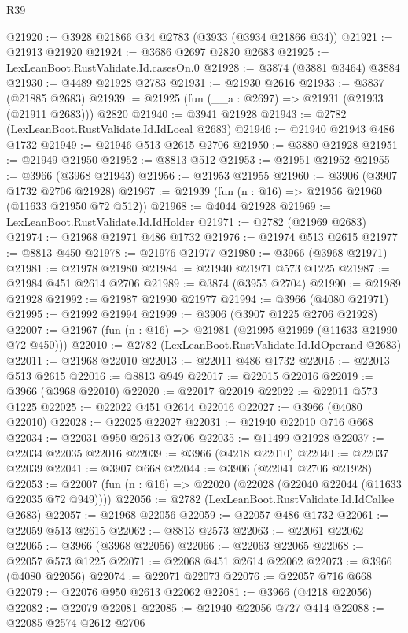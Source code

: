 \begin{lexlean}{R39}
\begin{coremodule}
@21920 := @3928 @21866 @34 @2783 (@3933 (@3934 @21866 @34))
@21921 := @21913 @21920
@21924 := @3686 @2697 @2820 @2683
@21925 := LexLeanBoot.RustValidate.Id.casesOn.{0}
@21928 := @3874 (@3881 @3464) @3884
@21930 := @4489 @21928 @2783
@21931 := @21930 @2616
@21933 := @3837 (@21885 @2683)
@21939 := @21925 (fun (__a : @2697) => @21931 (@21933 (@21911 @2683))) @2820
@21940 := @3941 @21928
@21943 := @2782 (LexLeanBoot.RustValidate.Id.IdLocal @2683)
@21946 := @21940 @21943 @486 @1732
@21949 := @21946 @513 @2615 @2706
@21950 := @3880 @21928
@21951 := @21949 @21950
@21952 := @8813 @512
@21953 := @21951 @21952
@21955 := @3966 (@3968 @21943)
@21956 := @21953 @21955
@21960 := @3906 (@3907 @1732 @2706 @21928)
@21967 := @21939 (fun (n : @16) => @21956 @21960 (@11633 @21950 @72 @512))
@21968 := @4044 @21928
@21969 := LexLeanBoot.RustValidate.Id.IdHolder
@21971 := @2782 (@21969 @2683)
@21974 := @21968 @21971 @486 @1732
@21976 := @21974 @513 @2615
@21977 := @8813 @450
@21978 := @21976 @21977
@21980 := @3966 (@3968 @21971)
@21981 := @21978 @21980
@21984 := @21940 @21971 @573 @1225
@21987 := @21984 @451 @2614 @2706
@21989 := @3874 (@3955 @2704)
@21990 := @21989 @21928
@21992 := @21987 @21990 @21977
@21994 := @3966 (@4080 @21971)
@21995 := @21992 @21994
@21999 := @3906 (@3907 @1225 @2706 @21928)
@22007 := @21967 (fun (n : @16) => @21981 (@21995 @21999 (@11633 @21990 @72 @450)))
@22010 := @2782 (LexLeanBoot.RustValidate.Id.IdOperand @2683)
@22011 := @21968 @22010
@22013 := @22011 @486 @1732
@22015 := @22013 @513 @2615
@22016 := @8813 @949
@22017 := @22015 @22016
@22019 := @3966 (@3968 @22010)
@22020 := @22017 @22019
@22022 := @22011 @573 @1225
@22025 := @22022 @451 @2614 @22016
@22027 := @3966 (@4080 @22010)
@22028 := @22025 @22027
@22031 := @21940 @22010 @716 @668
@22034 := @22031 @950 @2613 @2706
@22035 := @11499 @21928
@22037 := @22034 @22035 @22016
@22039 := @3966 (@4218 @22010)
@22040 := @22037 @22039
@22041 := @3907 @668
@22044 := @3906 (@22041 @2706 @21928)
@22053 := @22007 (fun (n : @16) => @22020 (@22028 (@22040 @22044 (@11633 @22035 @72 @949))))
@22056 := @2782 (LexLeanBoot.RustValidate.Id.IdCallee @2683)
@22057 := @21968 @22056
@22059 := @22057 @486 @1732
@22061 := @22059 @513 @2615
@22062 := @8813 @2573
@22063 := @22061 @22062
@22065 := @3966 (@3968 @22056)
@22066 := @22063 @22065
@22068 := @22057 @573 @1225
@22071 := @22068 @451 @2614 @22062
@22073 := @3966 (@4080 @22056)
@22074 := @22071 @22073
@22076 := @22057 @716 @668
@22079 := @22076 @950 @2613 @22062
@22081 := @3966 (@4218 @22056)
@22082 := @22079 @22081
@22085 := @21940 @22056 @727 @414
@22088 := @22085 @2574 @2612 @2706

\end{coremodule}
\end{lexlean}
